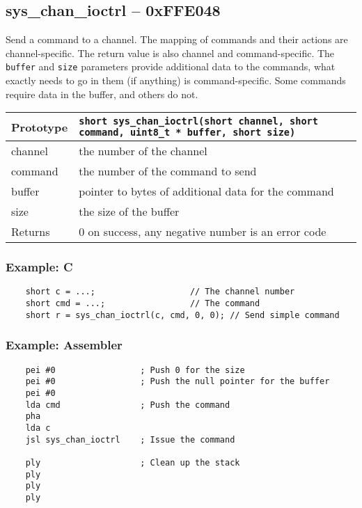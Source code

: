 \subsection*{sys\_chan\_ioctrl -- 0xFFE048}
Send a command to a channel.
The mapping of commands and their actions are channel-specific.
The return value is also channel and command-specific.
The \verb+buffer+ and \verb+size+ parameters provide additional data to the commands,
what exactly needs to go in them (if anything) is command-specific.
Some commands require data in the buffer, and others do not.

\bigskip

\begin{tabular}{|l||l|} \hline
Prototype & \lstinline!short sys_chan_ioctrl(short channel, short command, uint8_t * buffer, short size)! \\ \hline
channel & the number of the channel \\ \hline
command & the number of the command to send \\ \hline
buffer & pointer to bytes of additional data for the command \\ \hline
size & the size of the buffer \\ \hline
Returns & 0 on success, any negative number is an error code \\ \hline
\end{tabular}

\subsubsection*{Example: C}
\begin{lstlisting}
    short c = ...;                   // The channel number
    short cmd = ...;                 // The command
    short r = sys_chan_ioctrl(c, cmd, 0, 0); // Send simple command
\end{lstlisting}

\subsubsection*{Example: Assembler}
\begin{verbatim}
    pei #0                 ; Push 0 for the size
    pei #0                 ; Push the null pointer for the buffer
    pei #0
    lda cmd                ; Push the command
    pha
    lda c
    jsl sys_chan_ioctrl    ; Issue the command

    ply                    ; Clean up the stack
    ply
    ply
    ply
\end{verbatim}


